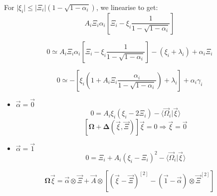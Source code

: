 \documentclass[aps,12pt]{revtex4}
\begin{document}
For $\vert\xi_i\vert  \leq \vert \Xi_i \vert \left(1-\sqrt{1-\alpha_i}\right)$,
we linearise to get:
\begin{equation}
	A_i \Xi_i \alpha_i \left[ \Xi_i  -   \xi_i \dfrac{1}{1-\sqrt{1-\alpha_i}}\right]
\end{equation}


\begin{equation}
	0 \simeq A_i \Xi_i \alpha_i \left[ \Xi_i  -   \xi_i \dfrac{1}{1-\sqrt{1-\alpha_i}}\right] - (\xi_i+\lambda_i) + \alpha_i \Xi_i
\end{equation}

\begin{equation}
	0 \simeq    - \left[\xi_i \left(1+A_i\Xi_i \dfrac{\alpha_i}{1-\sqrt{1-\alpha_i}}\right)+\lambda_i\right] + \alpha_i \gamma_i
	\end{equation}



\begin{itemize}
\item	$\vec{\alpha}=\vec{0}$
	\begin{equation}
	0 = A_i \xi_i (\xi_i-2\Xi_i) - \langle \vec{\Omega}_i\vert \vec{\xi} \rangle
	\end{equation}
	\begin{equation}
	\left[\bm{\Omega} + \bm{\Delta}(\vec{\xi},\vec{\Xi})\right] \vec{\xi} = 0 \Rightarrow \vec{\xi} = \vec{0}
	\end{equation}
	
\item	$\vec{\alpha}=\vec{1}$
	\begin{equation}
	0=\Xi_i + A_i(\xi_i-\Xi_i)^2 - \langle \vec{\Omega}_i\vert \vec{\xi} \rangle 
		\end{equation}
\end{itemize}

\begin{equation}
	\bm{\Omega} \vec{\xi} = 
	   \vec{\alpha} \otimes \vec{\Xi}
	    + \vec{A} \otimes \left[ (\vec{\xi}-\vec{\Xi})^{[2]} - \left(\vec{1}-\vec{\alpha}\right)\otimes \vec{\Xi}^{[2]}\right]
\end{equation}
  
  
 
\end{document}
